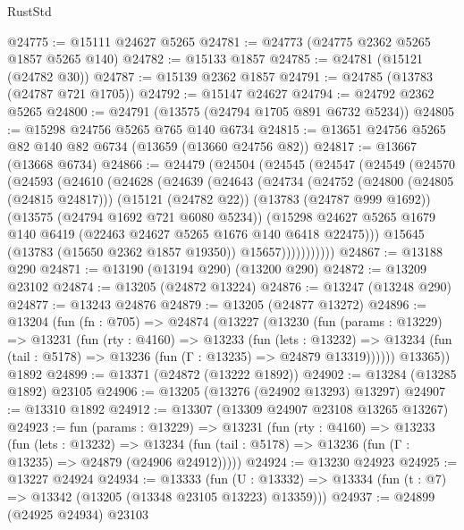 \begin{lexlean}{RustStd}
\begin{coremodule}
@24775 := @15111 @24627 @5265
@24781 := @24773 (@24775 @2362 @5265 @1857 @5265 @140)
@24782 := @15133 @1857
@24785 := @24781 (@15121 (@24782 @30))
@24787 := @15139 @2362 @1857
@24791 := @24785 (@13783 (@24787 @721 @1705))
@24792 := @15147 @24627
@24794 := @24792 @2362 @5265
@24800 := @24791 (@13575 (@24794 @1705 @891 @6732 @5234))
@24805 := @15298 @24756 @5265 @765 @140 @6734
@24815 := @13651 @24756 @5265 @82 @140 @82 @6734 (@13659 (@13660 @24756 @82))
@24817 := @13667 (@13668 @6734)
@24866 := @24479
    (@24504
      (@24545
        (@24547
          (@24549
            (@24570
              (@24593
                (@24610
                  (@24628
                    (@24639
                      (@24643
                        (@24734
                          (@24752
                            (@24800 (@24805 (@24815 @24817)))
                            (@15121 (@24782 @22))
                            (@13783 (@24787 @999 @1692))
                            (@13575 (@24794 @1692 @721 @6080 @5234))
                            (@15298
                              @24627
                              @5265
                              @1679
                              @140
                              @6419
                              (@22463 @24627 @5265 @1676 @140 @6418 @22475)))
                          @15645
                          (@13783 (@15650 @2362 @1857 @19350))
                          @15657)))))))))))
@24867 := @13188 @290
@24871 := @13190 (@13194 @290) (@13200 @290)
@24872 := @13209 @23102
@24874 := @13205 (@24872 @13224)
@24876 := @13247 (@13248 @290)
@24877 := @13243 @24876
@24879 := @13205 (@24877 @13272)
@24896 := @13204
    (fun (fn : @705) =>
    @24874
      (@13227
        (@13230
          (fun (params : @13229) =>
          @13231
            (fun (rty : @4160) =>
            @13233
              (fun (lets : @13232) =>
              @13234 (fun (tail : @5178) => @13236 (fun (Γ : @13235) => @24879 @13319))))))
        @13365))
    @1892
@24899 := @13371 (@24872 (@13222 @1892))
@24902 := @13284 (@13285 @1892) @23105
@24906 := @13205 (@13276 (@24902 @13293) @13297)
@24907 := @13310 @1892
@24912 := @13307 (@13309 @24907 @23108 @13265 @13267)
@24923 := fun (params : @13229) =>
  @13231
    (fun (rty : @4160) =>
    @13233
      (fun (lets : @13232) =>
      @13234 (fun (tail : @5178) => @13236 (fun (Γ : @13235) => @24879 (@24906 @24912)))))
@24924 := @13230 @24923
@24925 := @13227 @24924
@24934 := @13333
    (fun (U : @13332) => @13334 (fun (t : @7) => @13342 (@13205 (@13348 @23105 @13223) @13359)))
@24937 := @24899 (@24925 @24934) @23103

\end{coremodule}
\end{lexlean}
